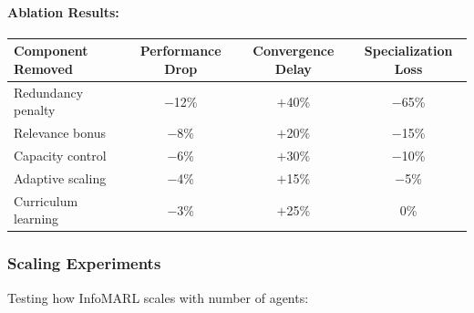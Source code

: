 \documentclass[10pt, letterpaper]{article}
\begin{document}
\paragraph{Ablation Results:}

\begin{center}
\begin{tabular}{lccc}
\toprule
\textbf{Component Removed} & \textbf{Performance Drop} & \textbf{Convergence Delay} & \textbf{Specialization Loss} \\
\midrule
Redundancy penalty & $-$12\% & $+$40\% & $-$65\% \\
Relevance bonus & $-$8\% & $+$20\% & $-$15\% \\
Capacity control & $-$6\% & $+$30\% & $-$10\% \\
Adaptive scaling & $-$4\% & $+$15\% & $-$5\% \\
Curriculum learning & $-$3\% & $+$25\% & 0\% \\
\bottomrule
\end{tabular}
\end{center}

\subsubsection{Scaling Experiments}

Testing how InfoMARL scales with number of agents:
\end{document}
